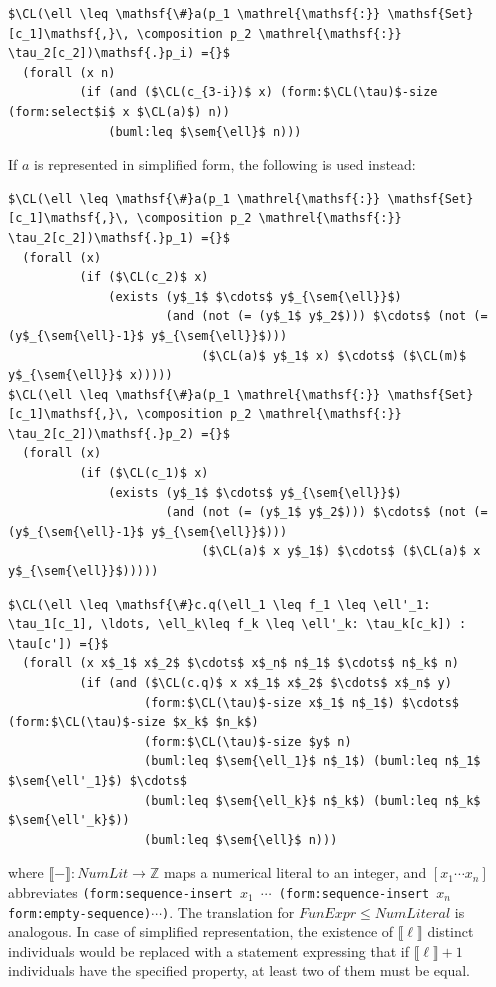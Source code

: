 \documentclass[10pt, a4paper]{isov2}
\newcommand*{\CL}{\ensuremath{\mathsf{CL}}\xspace}
\newcommand{\composition}{\raisebox{0.2pt}{\begin{sideways}\fontsize{6pt}{6pt}\selectfont$\blacklozenge$\end{sideways}}}
\newcommand{\ZZ}{\mathbb{Z}}
\newcommand{\sem}[1]{\mathopen\llbracket#1\mathclose\rrbracket}
\begin{document}
\begin{lstlisting}[language=clif, mathescape]
$\CL(\ell \leq \mathsf{\#}a(p_1 \mathrel{\mathsf{:}} \mathsf{Set}[c_1]\mathsf{,}\, \composition p_2 \mathrel{\mathsf{:}} \tau_2[c_2])\mathsf{.}p_i) ={}$
  (forall (x n)
          (if (and ($\CL(c_{3-i})$ x) (form:$\CL(\tau)$-size (form:select$i$ x $\CL(a)$) n))
              (buml:leq $\sem{\ell}$ n)))
\end{lstlisting}

\noindent If $a$
is represented in simplified form, the following is used instead:
%
\begin{lstlisting}[language=clif, mathescape]
$\CL(\ell \leq \mathsf{\#}a(p_1 \mathrel{\mathsf{:}} \mathsf{Set}[c_1]\mathsf{,}\, \composition p_2 \mathrel{\mathsf{:}} \tau_2[c_2])\mathsf{.}p_1) ={}$
  (forall (x)
          (if ($\CL(c_2)$ x)
              (exists (y$_1$ $\cdots$ y$_{\sem{\ell}}$)
                      (and (not (= (y$_1$ y$_2$))) $\cdots$ (not (= (y$_{\sem{\ell}-1}$ y$_{\sem{\ell}}$)))
                           ($\CL(a)$ y$_1$ x) $\cdots$ ($\CL(m)$ y$_{\sem{\ell}}$ x)))))
$\CL(\ell \leq \mathsf{\#}a(p_1 \mathrel{\mathsf{:}} \mathsf{Set}[c_1]\mathsf{,}\, \composition p_2 \mathrel{\mathsf{:}} \tau_2[c_2])\mathsf{.}p_2) ={}$
  (forall (x)
          (if ($\CL(c_1)$ x)
              (exists (y$_1$ $\cdots$ y$_{\sem{\ell}}$)
                      (and (not (= (y$_1$ y$_2$))) $\cdots$ (not (= (y$_{\sem{\ell}-1}$ y$_{\sem{\ell}}$)))
                           ($\CL(a)$ x y$_1$) $\cdots$ ($\CL(a)$ x y$_{\sem{\ell}}$)))))
\end{lstlisting}

\begin{lstlisting}[language=clif, mathescape]
$\CL(\ell \leq \mathsf{\#}c.q(\ell_1 \leq f_1 \leq \ell'_1: \tau_1[c_1], \ldots, \ell_k\leq f_k \leq \ell'_k: \tau_k[c_k]) : \tau[c']) ={}$
  (forall (x x$_1$ x$_2$ $\cdots$ x$_n$ n$_1$ $\cdots$ n$_k$ n)
          (if (and ($\CL(c.q)$ x x$_1$ x$_2$ $\cdots$ x$_n$ y)
                   (form:$\CL(\tau)$-size x$_1$ n$_1$) $\cdots$ (form:$\CL(\tau)$-size $x_k$ $n_k$)
                   (form:$\CL(\tau)$-size $y$ n)
                   (buml:leq $\sem{\ell_1}$ n$_1$) (buml:leq n$_1$ $\sem{\ell'_1}$) $\cdots$
                   (buml:leq $\sem{\ell_k}$ n$_k$) (buml:leq n$_k$ $\sem{\ell'_k}$))
                   (buml:leq $\sem{\ell}$ n)))
\end{lstlisting}
%
where $\sem{-} : \mathit{NumLit} \to \ZZ$
maps a numerical literal to an integer, and $[x_1\cdots x_n]$
abbreviates \texttt{(form:sequence-insert $x_1$
  $\cdots$
  (form:sequence-insert $x_n$
  form:empty-sequence)$\cdots$)}.
The translation for $\mathit{FunExpr} \leq \mathit{NumLiteral}$
is analogous. In case of simplified representation, the existence of
$\sem{\ell}$
distinct individuals would be replaced with a statement expressing that
if $\sem{\ell}+1$
individuals have the specified property, at least two of them must be
equal.
\end{document}
